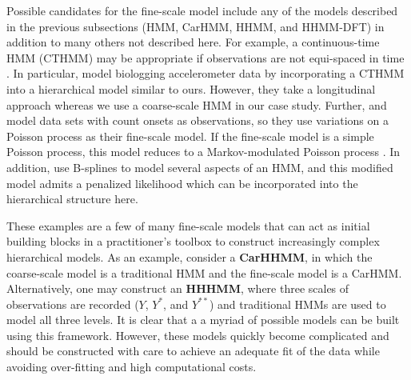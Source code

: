 Possible candidates for the fine-scale model include any of the models described in the previous subsections (HMM, CarHMM, HHMM, and HHMM-DFT) in addition to many others not described here. 
For example, a continuous-time HMM (CTHMM) may be appropriate if observations are not equi-spaced in time \citep{Liu:2015}. In particular, \citet{Xu:2018} model biologging accelerometer data by incorporating a CTHMM into a hierarchical model similar to ours. However, they take a longitudinal approach whereas we use a coarse-scale HMM in our case study.
Further, \citet{Bebbington:2007} and \citet{Borchers:2013} model data sets with count onsets as observations, so they use variations on a Poisson process as their fine-scale model. If the fine-scale model is a simple Poisson process, this model reduces to a Markov-modulated Poisson process \citep{Fischer:1993}.
In addition, \citep{Langrock:2018} use B-splines to model several aspects of an HMM, and this modified model admits a penalized likelihood which can be incorporated into the hierarchical structure here. 

These examples are a few of many fine-scale models that can act as initial building blocks in a practitioner's toolbox to construct increasingly complex hierarchical models. As an example, consider a \textbf{CarHHMM}, in which the coarse-scale model is a traditional HMM and the fine-scale model is a CarHMM. Alternatively, one may construct an \textbf{HHHMM}, where three scales of observations are recorded ($Y$, $Y^*$, and $Y^{**}$) and traditional HMMs are used to model all three levels. It is clear that a a myriad of possible models can be built using this framework. However, these models quickly become complicated and should be constructed with care to achieve an adequate fit of the data while avoiding over-fitting and high computational costs.
